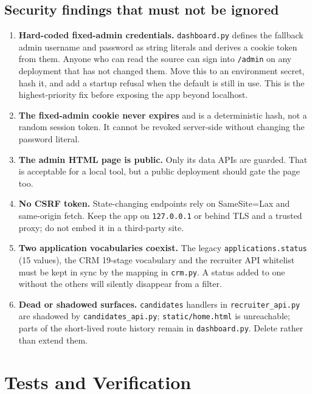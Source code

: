 \documentclass[11pt,a4paper]{article}
\newcommand{\file}[1]{\texttt{\small #1}}
\newcommand{\code}[1]{\texttt{#1}}
\begin{document}
\subsection{Security findings that must not be ignored}
\begin{enumerate}[leftmargin=2em]
  \item \textbf{Hard-coded fixed-admin credentials.} \file{dashboard.py}
        defines the fallback admin username and password as string literals
        and derives a cookie token from them. Anyone who can read the source
        can sign into \file{/admin} on any deployment that has not changed
        them. Move this to an environment secret, hash it, and add a startup
        refusal when the default is still in use. This is the highest-priority
        fix before exposing the app beyond localhost.
  \item \textbf{The fixed-admin cookie never expires} and is a deterministic
        hash, not a random session token. It cannot be revoked server-side
        without changing the password literal.
  \item \textbf{The admin HTML page is public.} Only its data APIs are guarded.
        That is acceptable for a local tool, but a public deployment should
        gate the page too.
  \item \textbf{No CSRF token.} State-changing endpoints rely on
        SameSite=Lax and same-origin fetch. Keep the app on
        \code{127.0.0.1} or behind TLS and a trusted proxy; do not embed it in
        a third-party site.
  \item \textbf{Two application vocabularies coexist.} The legacy
        \code{applications.status} (15 values), the CRM 19-stage vocabulary and
        the recruiter API whitelist must be kept in sync by the mapping in
        \file{crm.py}. A status added to one without the others will silently
        disappear from a filter.
  \item \textbf{Dead or shadowed surfaces.} \code{candidates} handlers in
        \file{recruiter\_api.py} are shadowed by \file{candidates\_api.py};
        \file{static/home.html} is unreachable; parts of the short-lived route
        history remain in \file{dashboard.py}. Delete rather than extend them.
\end{enumerate}

\section{Tests and Verification}
\label{u:tests}
\end{document}
